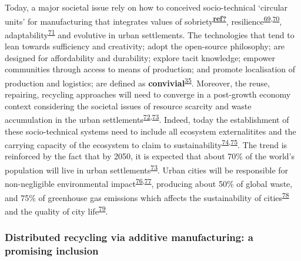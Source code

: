 \documentclass[
  12pt,
  a4paperpaper,
  onecolumn]{article}
\begin{document}
Today, a major societal issue rely on how to conceived socio-technical
`circular units' for manufacturing that integrates values of
sobriety\textsuperscript{\protect\hyperlink{ref-ref}{\textbf{ref?}}},
resilience\textsuperscript{\protect\hyperlink{ref-touriki2021}{69},\protect\hyperlink{ref-VanFan2019}{70}},
adaptability\textsuperscript{\protect\hyperlink{ref-weichhart2021}{71}}
and evolutive in urban settlements. The technologies that tend to lean
towards sufficiency and creativity; adopt the open-source philosophy;
are designed for affordability and durability; explore tacit knowledge;
empower communities through access to means of production; and promote
localisation of production and logistics; are defined as
\textbf{convivial}\textsuperscript{\protect\hyperlink{ref-priavolou2022}{35}}.
Moreover, the reuse, repairing, recycling approaches will need to
converge in a post-growth economy context considering the societal
issues of resource scarcity and waste accumulation in the urban
settlements\textsuperscript{\protect\hyperlink{ref-kallis2018}{72},\protect\hyperlink{ref-savini2021}{73}}.
Indeed, today the establishment of these socio-technical systems need to
include all ecosystem externalitites and the carrying capacity of the
ecosystem to claim to
sustainability\textsuperscript{\protect\hyperlink{ref-Bakshi2018}{74},\protect\hyperlink{ref-Bakshi2019a}{75}}.
The trend is reinforced by the fact that by 2050, it is expected that
about 70\% of the world's population will live in urban
settlements\textsuperscript{\protect\hyperlink{ref-savini2021}{73}}.
Urban cities will be responsible for non-negligible environmental
impact\textsuperscript{\protect\hyperlink{ref-Zheng2020}{76},\protect\hyperlink{ref-Sodiq2019}{77}},
producing about 50\% of global waste, and 75\% of greenhouse gas
emissions which affects the sustainability of
cities\textsuperscript{\protect\hyperlink{ref-schraven2021}{78}} and the
quality of city
life\textsuperscript{\protect\hyperlink{ref-Riffat2016}{79}}.

\hypertarget{distributed-recycling-via-additive-manufacturing-a-promising-inclusion}{%
\subsubsection{Distributed recycling via additive manufacturing: a
promising
inclusion}\label{distributed-recycling-via-additive-manufacturing-a-promising-inclusion}}
\end{document}

